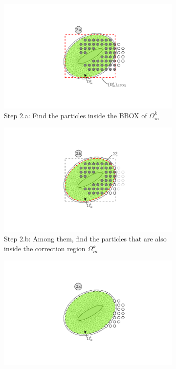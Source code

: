 	\begin{figure}[p]
     \centering
     \begin{subfigure}[t]{0.55\textwidth}
		\includegraphics[trim=8.05cm 2.85cm 5.4cm 3.05cm, clip, width=0.9\linewidth]{./figures/coupling/removeParticles/removeParticles_part1.pdf}
		\caption{Step 2.a: Find the particles inside the BBOX of $\Omega_{in}^k$}
		\label{fig:removeParticles_part1}
	 \end{subfigure}%
	 \quad%
     \begin{subfigure}[t]{0.55\textwidth}
		\includegraphics[trim=8.05cm 2.85cm 5.4cm 3.05cm, clip, width=0.9\linewidth]{./figures/coupling/removeParticles/removeParticles_part2.pdf}
		\caption{Step 2.b: Among them, find the particles that are also inside the correction region $\Omega_{in}^k$}
		\label{fig:removeParticles_part2}
	 \end{subfigure}%
	 \quad
     \begin{subfigure}[t]{0.55\textwidth}
		\includegraphics[trim=8.05cm 2.85cm 5.4cm 3.05cm, clip, width=0.9\linewidth]{./figures/coupling/removeParticles/removeParticles_part3.pdf}

\end{subfigure}
\end{figure}
